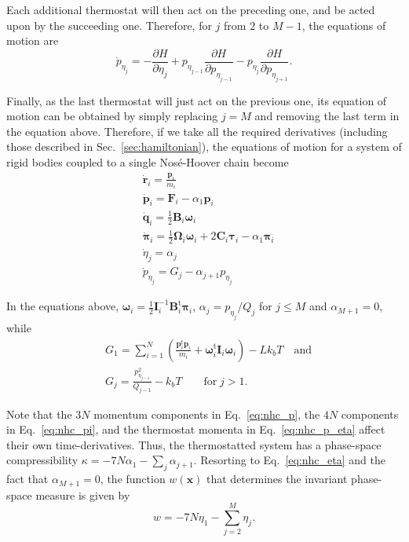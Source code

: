 \documentclass[aip,jcp,reprint,amsmath,amssymb]{revtex4-1}
\newcommand{\mt}[1]{\boldsymbol{\mathbf{#1}}}           %
\newcommand{\vt}[1]{\boldsymbol{\mathbf{#1}}}           %
\newcommand{\tr}[1]{#1^\text{t}}                        %
\newcommand{\diff}[2]{\dfrac{\partial #1}{\partial #2}} %
\begin{document}
Each additional thermostat will then act on the preceding one, and be acted upon by the succeeding one. Therefore, for $j$ from $2$ to $M-1$, the equations of motion are
\[
{\dot p}_{\eta_j} = -\diff{H}{\eta_j} + p_{\eta_{j-1}} \diff{H}{p_{\eta_{j-1}}} - p_{\eta_j} \diff{H}{p_{\eta_{j+1}}}.
\]

Finally, as the last thermostat will just act on the previous one, its equation of motion can be obtained by simply replacing $j = M$ and removing the last term in the equation above. Therefore, if we take all the required derivatives (including those described in Sec.~\ref{sec:hamiltonian}), the equations of motion for a system of rigid bodies coupled to a single Nos\'e-Hoover chain become
\begin{subequations}
\label{eq:nhc_system}
\begin{align}
&\dot{\vt r}_i = \frac{{\vt p}_i}{m_i} \\ 
&\dot{\vt p}_i = {\vt F}_i - \alpha_1 \vt p_i \label{eq:nhc_p} \\
&\dot{\vt q}_i = \frac{1}{2} \mt B_i \vt \omega_i \label{eq:nhc_q} \\
&\dot{\vt \pi}_i = \frac{1}{2} \mt \Omega_i \vt \omega_i + 2 \mt C_i \vt \tau_i - \alpha_1 \vt \pi_i \label{eq:nhc_pi} \\
&\dot{\eta}_j = \alpha_j \label{eq:nhc_eta} \\
&{\dot p}_{\eta_j} = G_j - \alpha_{j+1} p_{\eta_j}  \label{eq:nhc_p_eta}
\end{align}
\end{subequations}

In the equations above, ${\vt \omega}_i = \frac{1}{2} {\mt I}_i^{-1} \tr{\mt B}_i {\vt \pi}_i$, $\alpha_j = {p_{\eta_j}}/{Q_j}$ for $j \leq M$ and $\alpha_{M+1} = 0$, while
\begin{align*}
&G_1 = \sum_{i=1}^N \left( \frac{\tr{\vt p}_i{\vt p}_i}{m_i} + \tr{\vt \omega}_i \mt I_i \vt \omega_i \right) - L k_b T \quad \text{and}\\
&G_j = \frac{p_{\eta_{j-1}}^2}{Q_{j-1}} - k_b T \qquad \text{for} \; j > 1.
\end{align*}

Note that the $3N$ momentum components in Eq.~\ref{eq:nhc_p}, the $4N$ components in Eq.~\ref{eq:nhc_pi}, and the thermostat momenta in Eq.~\ref{eq:nhc_p_eta} affect their own time-derivatives. Thus, the thermostatted system has a phase-space compressibility $\kappa = -7N \alpha_1 - \sum_j \alpha_{j+1}$. Resorting to Eq.~\ref{eq:nhc_eta} and the fact that $\alpha_{M+1} = 0$, the function $w(\vt x)$ that determines the invariant phase-space measure is given by
\begin{equation}
\label{eq:nhc_measure}
w = -7N \eta_1 - \sum_{j=2}^M \eta_j.
\end{equation}
\end{document}
